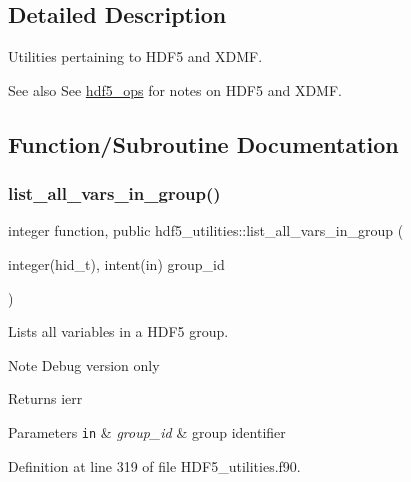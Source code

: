 \subsection{Detailed Description}
Utilities pertaining to H\+D\+F5 and X\+D\+MF. 

\begin{DoxySeeAlso}{See also}
See \hyperlink{namespacehdf5__ops}{hdf5\+\_\+ops} for notes on H\+D\+F5 and X\+D\+MF. 
\end{DoxySeeAlso}


\subsection{Function/\+Subroutine Documentation}
\mbox{\label{namespacehdf5__utilities_aa9d76166f970a7052cd0d96c8f3ee0be}} 
\subsubsection{\texorpdfstring{list\+\_\+all\+\_\+vars\+\_\+in\+\_\+group()}{list\_all\_vars\_in\_group()}}
{\footnotesize\ttfamily integer function, public hdf5\+\_\+utilities\+::list\+\_\+all\+\_\+vars\+\_\+in\+\_\+group (\begin{DoxyParamCaption}\item[{integer(hid\+\_\+t), intent(in)}]{group\+\_\+id }\end{DoxyParamCaption})}



Lists all variables in a H\+D\+F5 group. 

\begin{DoxyNote}{Note}
Debug version only
\end{DoxyNote}
\begin{DoxyReturn}{Returns}
ierr
\end{DoxyReturn}

\begin{DoxyParams}[1]{Parameters}
\mbox{\tt in}  & {\em group\+\_\+id} & group identifier \\
\hline
\end{DoxyParams}


Definition at line 319 of file H\+D\+F5\+\_\+utilities.\+f90.

